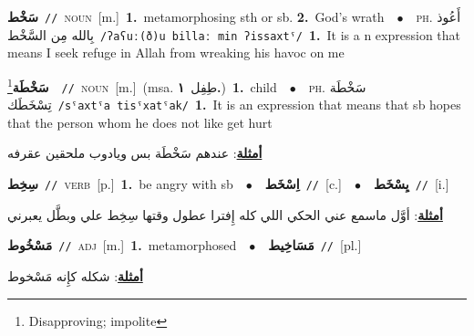 \documentclass[10pt,a4paper,twoside]{article} %
\begin{document}
\begin{multicols}{2}
{\setlength\topsep{0pt}\textbf{\foreignlanguage{arabic}{سَخْط}}\ {\color{gray}\texttt{//}\color{black}}\ \textsc{noun}\ [m.]\ \textbf{1.}~metamorphosing sth or sb.  \textbf{2.}~God's wrath\ \ $\bullet$\ \ \textsc{ph.} \color{gray} \foreignlanguage{arabic}{أَعُوذ بِالله مِن السَّخْط}\color{black}\ {\color{gray}\texttt{/{\sffamily ʔaʕuː(ð)u billaː min ʔissaxtˤ}/}\color{black}}\ \textbf{1.}~It is a n expression that means I seek refuge in Allah from wreaking his havoc on me\ } \vspace{2mm}

{\setlength\topsep{0pt}\textbf{\foreignlanguage{arabic}{سَخْطَة}}\footnote{Disapproving; impolite}\ \ {\color{gray}\texttt{//}\color{black}}\ \textsc{noun}\ [m.]\ \color{gray}(msa. \foreignlanguage{arabic}{طِفِل}~\foreignlanguage{arabic}{\textbf{١.}})\color{black}\ \textbf{1.}~child\ \ $\bullet$\ \ \textsc{ph.} \color{gray} \foreignlanguage{arabic}{سَخْطَة تِسْخَطَك}\color{black}\ {\color{gray}\texttt{/{\sffamily sˤaxtˤa tisˤxatˤak}/}\color{black}}\ \textbf{1.}~It is an expression that means that sb hopes that the person whom he does not like get hurt\  \begin{flushright}\color{gray}\foreignlanguage{arabic}{\textbf{\underline{\foreignlanguage{arabic}{أمثلة}}}: عندهم سَخْطَة بس ويادوب ملحقين عقرفه}\end{flushright}\color{black}} \vspace{2mm}

{\setlength\topsep{0pt}\textbf{\foreignlanguage{arabic}{سِخِط}}\ {\color{gray}\texttt{//}\color{black}}\ \textsc{verb}\ [p.]\ \textbf{1.}~be angry with sb\ \ $\bullet$\ \ \setlength\topsep{0pt}\textbf{\foreignlanguage{arabic}{اِسْخَط}}\ {\color{gray}\texttt{//}\color{black}}\ [c.]\ \ $\bullet$\ \ \setlength\topsep{0pt}\textbf{\foreignlanguage{arabic}{يِسْخَط}}\ {\color{gray}\texttt{//}\color{black}}\ [i.]\  \begin{flushright}\color{gray}\foreignlanguage{arabic}{\textbf{\underline{\foreignlanguage{arabic}{أمثلة}}}: أوَّل ماسمع عني الحكي اللي كله إِفترا عطول وقتها سِخِط علي وبطَّل يعبرني}\end{flushright}\color{black}} \vspace{2mm}

{\setlength\topsep{0pt}\textbf{\foreignlanguage{arabic}{مَسْخُوط}}\ {\color{gray}\texttt{//}\color{black}}\ \textsc{adj}\ [m.]\ \textbf{1.}~metamorphosed\ \ $\bullet$\ \ \setlength\topsep{0pt}\textbf{\foreignlanguage{arabic}{مَسَاخِيط}}\ {\color{gray}\texttt{//}\color{black}}\ [pl.]\  \begin{flushright}\color{gray}\foreignlanguage{arabic}{\textbf{\underline{\foreignlanguage{arabic}{أمثلة}}}: شكله كإِنه مَسْخوط}\end{flushright}\color{black}} \vspace{2mm}


\end{multicols}
\end{document}
